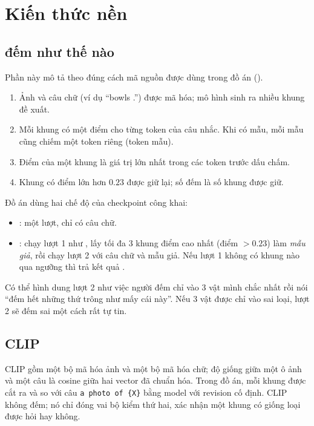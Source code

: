 \documentclass[12pt,a4paper]{article}
\begin{document}
\section{Kiến thức nền}\label{sec:background}

\subsection{\cgdpp{} đếm như thế nào}
Phần này mô tả \cgdpp{} theo đúng cách mã nguồn được dùng trong đồ án ().
\begin{enumerate}
\item Ảnh và câu chữ (ví dụ ``bowls .'') được mã hóa; mô hình sinh ra nhiều khung đề xuất.
\item Mỗi khung có một điểm cho từng token của câu nhắc. Khi có mẫu, mỗi mẫu cũng chiếm một token riêng (token mẫu).
\item Điểm của một khung là giá trị lớn nhất trong các token trước dấu chấm.
\item Khung có điểm lớn hơn $0.23$ được giữ lại; số đếm là số khung được giữ.
\end{enumerate}
Đồ án dùng hai chế độ của checkpoint công khai:
\begin{itemize}
\item \textbf{\Bzero}: một lượt, chỉ có câu chữ.
\item \textbf{\Btwo}: chạy lượt 1 như \Bzero, lấy tối đa 3 khung điểm cao nhất (điểm $>0.23$) làm \emph{mẫu giả}, rồi chạy lượt 2 với câu chữ và mẫu giả. Nếu lượt 1 không có khung nào qua ngưỡng thì trả kết quả \Bzero.
\end{itemize}
Có thể hình dung lượt 2 như việc người đếm chỉ vào 3 vật mình chắc nhất rồi nói ``đếm hết những thứ trông như mấy cái này''. Nếu 3 vật được chỉ vào sai loại, lượt 2 sẽ đếm sai một cách rất tự tin.

\subsection{CLIP}
CLIP \parencite{radford2021clip} gồm một bộ mã hóa ảnh và một bộ mã hóa chữ; độ giống giữa một ô ảnh và một câu là cosine giữa hai vector đã chuẩn hóa. Trong đồ án, mỗi khung được cắt ra và so với câu \texttt{a photo of \{X\}} bằng model  với revision cố định. CLIP không đếm; nó chỉ đóng vai bộ kiểm thứ hai, xác nhận một khung có giống loại được hỏi hay không.
\end{document}
